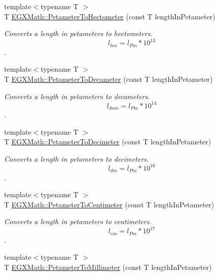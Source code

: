 \begin{DoxyCompactItemize}
{\footnotesize template$<$typename T $>$ }\\T \mbox{\hyperlink{group___e_g_x_math-_conversions-_length_conversions-_s_i-_petameter-_s_i_ga18de0d328d6200590dd25a522ad1aeb4}{E\+G\+X\+Math\+::\+Petameter\+To\+Hectometer}} (const T length\+In\+Petameter)
\begin{DoxyCompactList}\small\item\em Converts a length in petameters to hectometers. \[ l_{hm}=l_{Pm} * 10^{13} \]. \end{DoxyCompactList}\item 
{\footnotesize template$<$typename T $>$ }\\T \mbox{\hyperlink{group___e_g_x_math-_conversions-_length_conversions-_s_i-_petameter-_s_i_gaf0fe67e33a48584d1f9f0ffa1ca4c8f9}{E\+G\+X\+Math\+::\+Petameter\+To\+Decameter}} (const T length\+In\+Petameter)
\begin{DoxyCompactList}\small\item\em Converts a length in petameters to decameters. \[ l_{dam}=l_{Pm} * 10^{14} \]. \end{DoxyCompactList}\item 
{\footnotesize template$<$typename T $>$ }\\T \mbox{\hyperlink{group___e_g_x_math-_conversions-_length_conversions-_s_i-_petameter-_s_i_ga1e0359fb350c64cd3e1fc9293376de96}{E\+G\+X\+Math\+::\+Petameter\+To\+Decimeter}} (const T length\+In\+Petameter)
\begin{DoxyCompactList}\small\item\em Converts a length in petameters to decimeters. \[ l_{dm}=l_{Pm} * 10^{16} \]. \end{DoxyCompactList}\item 
{\footnotesize template$<$typename T $>$ }\\T \mbox{\hyperlink{group___e_g_x_math-_conversions-_length_conversions-_s_i-_petameter-_s_i_ga68b8b99b5e0f36fee33e5f0d0dea3f2b}{E\+G\+X\+Math\+::\+Petameter\+To\+Centimeter}} (const T length\+In\+Petameter)
\begin{DoxyCompactList}\small\item\em Converts a length in petameters to centimeters. \[ l_{cm}=l_{Pm} * 10^{17} \]. \end{DoxyCompactList}\item 
{\footnotesize template$<$typename T $>$ }\\T \mbox{\hyperlink{group___e_g_x_math-_conversions-_length_conversions-_s_i-_petameter-_s_i_ga932654bf571e2dd9aa912a34fbcfe49f}{E\+G\+X\+Math\+::\+Petameter\+To\+Millimeter}} (const T length\+In\+Petameter)

\end{DoxyCompactItemize}
